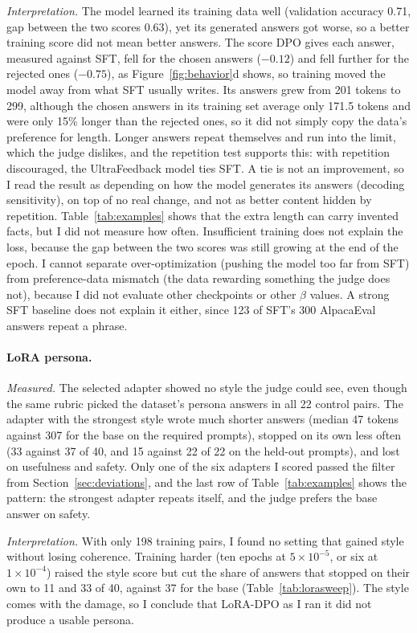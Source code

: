 \emph{Interpretation.} The model learned its training data well (validation accuracy 0.71, gap between the two scores 0.63), yet its generated answers got worse, so a better training score did not mean better answers. The score DPO gives each answer, measured against SFT, fell for the chosen answers ($-0.12$) and fell further for the rejected ones ($-0.75$), as Figure~\ref{fig:behavior}d shows, so training moved the model away from what SFT usually writes. Its answers grew from 201 tokens to 299, although the chosen answers in its training set average only 171.5 tokens and were only 15\% longer than the rejected ones, so it did not simply copy the data's preference for length. Longer answers repeat themselves and run into the limit, which the judge dislikes, and the repetition test supports this: with repetition discouraged, the UltraFeedback model ties SFT. A tie is not an improvement, so I read the result as depending on how the model generates its answers (decoding sensitivity), on top of no real change, and not as better content hidden by repetition. Table~\ref{tab:examples} shows that the extra length can carry invented facts, but I did not measure how often. Insufficient training does not explain the loss, because the gap between the two scores was still growing at the end of the epoch. I cannot separate over-optimization (pushing the model too far from SFT) from preference-data mismatch (the data rewarding something the judge does not), because I did not evaluate other checkpoints or other $\beta$ values. A strong SFT baseline does not explain it either, since 123 of SFT's 300 AlpacaEval answers repeat a phrase.

\paragraph{LoRA persona.} \emph{Measured.} The selected adapter showed no style the judge could see, even though the same rubric picked the dataset's persona answers in all 22 control pairs. The adapter with the strongest style wrote much shorter answers (median 47 tokens against 307 for the base on the required prompts), stopped on its own less often (33 against 37 of 40, and 15 against 22 of 22 on the held-out prompts), and lost on usefulness and safety. Only one of the six adapters I scored passed the filter from Section~\ref{sec:deviations}, and the last row of Table~\ref{tab:examples} shows the pattern: the strongest adapter repeats itself, and the judge prefers the base answer on safety.

\emph{Interpretation.} With only 198 training pairs, I found no setting that gained style without losing coherence. Training harder (ten epochs at $5\times10^{-5}$, or six at $1\times10^{-4}$) raised the style score but cut the share of answers that stopped on their own to 11 and 33 of 40, against 37 for the base (Table~\ref{tab:lorasweep}). The style comes with the damage, so I conclude that LoRA-DPO as I ran it did not produce a usable persona.

